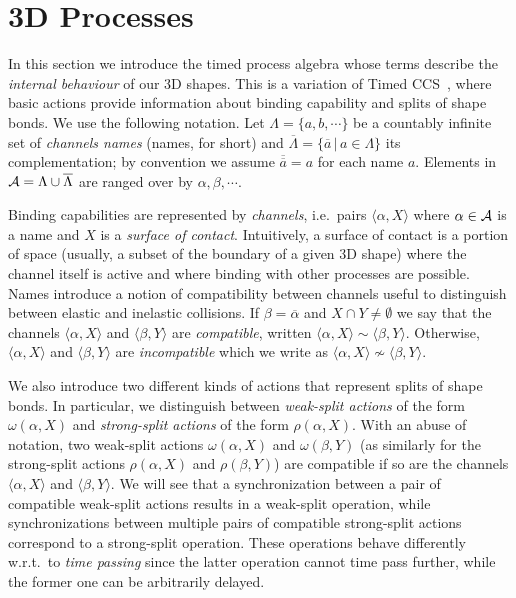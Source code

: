 \documentclass[11pt]{article}
\newcommand{\comp}{\sim}
\newcommand{\cname}{{\cal A}}
\begin{document}
\section{3D Processes}
\label{sec:three}
In this section we introduce the timed process algebra whose terms describe the {\em internal
behaviour} of our 3D shapes. This is a variation of Timed CCS~\cite{Yi1990}, where basic actions
provide information about binding capability and splits of shape bonds. We use the following
notation. Let $\Lambda =\{a, b, \cdots\}$ be a countably infinite set of {\em channels names}
(names, for short) and $\overline{\Lambda} = \{\overline{a} \,|\, a \in \Lambda\}$ its
complementation; by convention we assume $\overline{\overline{a}} = a$ for each name $a$. Elements
in $\cname = \Lambda \cup \overline{\Lambda}$ are ranged over by $\alpha,\beta, \cdots$.

Binding capabilities are represented by {\em channels}, i.e.\ pairs $\langle \alpha, X\rangle$ where $\alpha \in \cname$ is a name and $X$ is a {\em surface of contact}. Intuitively, a surface
of contact is a portion of space (usually, a subset of the boundary of a given 3D shape) where the
channel itself is active and where binding with other processes are possible. Names introduce a
notion of compatibility between channels useful to distinguish between elastic and inelastic
collisions. If $\beta = \overline{\alpha}$ and $X \cap Y\neq \emptyset$ we say that the channels
$\langle \alpha, X \rangle$ and $\langle \beta, Y\rangle$ are {\em compatible}, written  $\langle
\alpha, X \rangle \comp \langle \beta, Y \rangle$. Otherwise, $\langle \alpha, X \rangle$ and
$\langle \beta, Y \rangle$ are {\em incompatible} which we write as $\langle \alpha, X \rangle \not \comp \langle \beta, Y \rangle$.

We also introduce two  different kinds of actions that represent splits of shape bonds. In particular, we distinguish between {\em weak-split actions} of the form $\omega(\alpha, X)$ and {\em strong-split actions} of the form $\rho(\alpha,X)$. With an abuse of notation, two weak-split actions $\omega(\alpha, X)$ and $\omega(\beta,Y)$ (as similarly for the strong-split actions $\rho(\alpha, X)$ and $\rho(\beta,Y)$) are compatible if so are the channels $\langle \alpha, X \rangle$ and $\langle \beta, Y \rangle$. We will see that a synchronization between a pair of compatible weak-split actions results in a weak-split operation, while synchronizations between multiple pairs of compatible strong-split actions correspond to a strong-split operation. These operations behave differently w.r.t.\ to {\em time passing} since the latter operation cannot time pass further, while the former one can be arbitrarily delayed.
\end{document}
